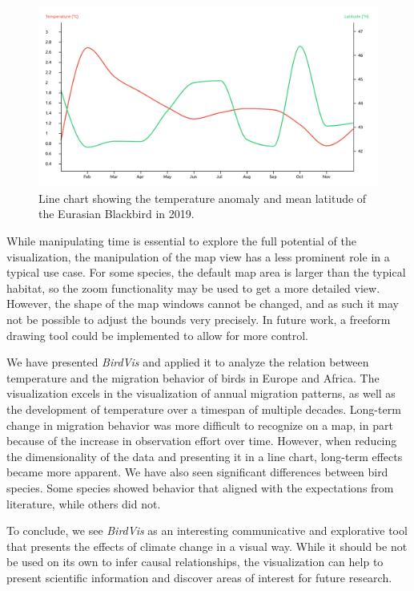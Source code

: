 \documentclass[journal]{vgtc}                %
\begin{document}
\begin{figure}[t]
  \centering
  \includegraphics[width=\linewidth]{monthly-graph16-eurbla.png}
  \caption{Line chart showing  the temperature anomaly and mean latitude of the Eurasian Blackbird in 2019.}
  \label{fig:monthly-graph16-eurbla}
\end{figure}

While manipulating time is essential to explore the full potential of the visualization, the manipulation of the map view has a less prominent role in a typical use case. For some species, the default map area is larger than the typical habitat, so the zoom functionality may be used to get a more detailed view. However, the shape of the map windows cannot be changed, and as such it may not be possible to adjust the bounds very precisely. In future work, a freeform drawing tool could be implemented to allow for more control.

We have presented \emph{BirdVis} and applied it to analyze the relation between temperature and the migration behavior of birds in Europe and Africa. The visualization excels in the visualization of annual migration patterns, as well as the development of temperature over a timespan of multiple decades. Long-term change in migration behavior was more difficult to recognize on a map, in part because of the increase in observation effort over time. However, when reducing the dimensionality of the data and presenting it in a line chart, long-term effects became more apparent. We have also seen significant differences between bird species. Some species showed behavior that aligned with the expectations from literature, while others did not.

To conclude, we see \emph{BirdVis} as an interesting communicative and explorative tool that presents the effects of climate change in a visual way. While it should be not be used on its own to infer causal relationships, the visualization can help to present scientific information and discover areas of interest for future research.



\end{document}
